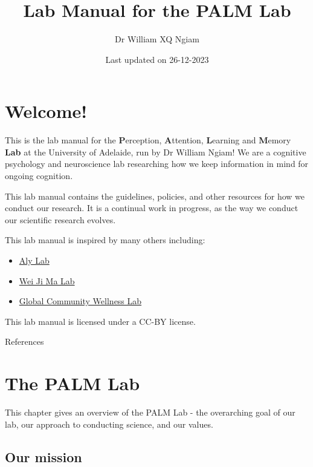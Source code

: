 \documentclass[
]{book}
\title{Lab Manual for the PALM Lab}
\author{Dr William XQ Ngiam}
\date{Last updated on 26-12-2023}
\providecommand{\tightlist}{%
  \setlength{\itemsep}{0pt}\setlength{\parskip}{0pt}}
\theoremstyle{definition}
\theoremstyle{definition}
\theoremstyle{definition}
\theoremstyle{definition}
\theoremstyle{remark}
\begin{document}
\maketitle

{
\setcounter{tocdepth}{1}
\tableofcontents
}
\hypertarget{welcome}{%
\chapter*{Welcome!}\label{welcome}}

This is the lab manual for the \textbf{P}erception, \textbf{A}ttention, \textbf{L}earning and \textbf{M}emory \textbf{Lab} at the University of Adelaide, run by Dr William Ngiam! We are a cognitive psychology and neuroscience lab researching how we keep information in mind for ongoing cognition.

This lab manual contains the guidelines, policies, and other resources for how we conduct our research. It is a continual work in progress, as the way we conduct our scientific research evolves.

This lab manual is inspired by many others including:

\begin{itemize}
\tightlist
\item
  \href{https://github.com/alylab/labmanual/blob/master/aly-lab-manual.pdf}{Aly Lab}
\item
  \href{https://www.cns.nyu.edu/malab/lablife.html}{Wei Ji Ma Lab}
\item
  \href{https://bookdown.org/jordandanielsnyder/LabManual/expectations-and-responsiblities.html}{Global Community Wellness Lab}
\end{itemize}

This lab manual is licensed under a CC-BY license.

References

\hypertarget{the-lab}{%
\chapter{The PALM Lab}\label{the-lab}}

This chapter gives an overview of the PALM Lab - the overarching goal of our lab, our approach to conducting science, and our values.

\hypertarget{lab-mission}{%
\section{Our mission}\label{lab-mission}}
\end{document}
